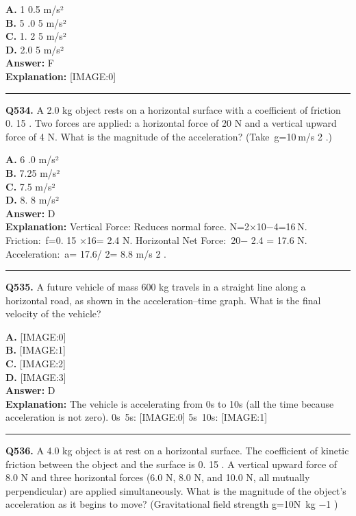 \documentclass[12pt]{article}
\begin{document}
\textbf{A.} 1
0.5 m/s² \\
\textbf{B.} 5
.0
5
m/s² \\
\textbf{C.} 1.
2
5 m/s² \\
\textbf{D.} 2.0
5
m/s² \\

\textbf{Answer:} F \\
\textbf{Explanation:} [IMAGE:0]

\hrule
\vspace{1em}


\noindent
\textbf{Q534.} A 2.0 kg object rests on a horizontal surface with a coefficient of friction 0.
15
. Two forces are applied: a horizontal force of 20 N and a vertical upward force of 4 N. What is the magnitude of the acceleration? (Take g=10 m/s
2
.)



\textbf{A.} 6
.0 m/s² \\
\textbf{B.} 7.25 m/s² \\
\textbf{C.} 7.5 m/s² \\
\textbf{D.} 8.
8
m/s² \\

\textbf{Answer:} D \\
\textbf{Explanation:} Vertical Force: Reduces normal force.
N=2×10−4=16 N.
Friction: f=0.
15
×16=
2.4
N.
Horizontal Net Force: 20−
2.4
=
17.6
N.
Acceleration: a=
17.6/
2=
8.8
m/s
2
.

\hrule
\vspace{1em}


\noindent
\textbf{Q535.} A future vehicle of mass 600 kg travels in a straight line along a horizontal road, as shown in the acceleration–time graph.
What is the final velocity of the vehicle?



\textbf{A.} [IMAGE:0] \\
\textbf{B.} [IMAGE:1] \\
\textbf{C.} [IMAGE:2] \\
\textbf{D.} [IMAGE:3] \\

\textbf{Answer:} D \\
\textbf{Explanation:} The vehicle is accelerating from 0s to 10s (all the time because acceleration is not zero).
0s~5s:
[IMAGE:0]
5s~10s:
[IMAGE:1]

\hrule
\vspace{1em}


\noindent
\textbf{Q536.} A 4.0 kg object is at rest on a horizontal surface. The coefficient of kinetic friction between the object and the surface is 0.
15
. A vertical upward force of 8.0 N and three horizontal forces (6.0 N, 8.0 N, and 10.0 N, all mutually perpendicular) are applied simultaneously. What is the magnitude of the object's acceleration as it begins to move? (Gravitational field strength g=10N kg
−1
)
\end{document}
